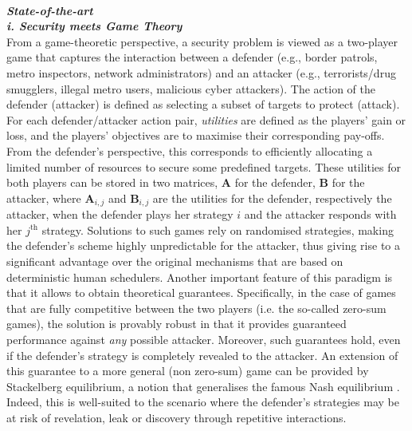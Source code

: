 \noindent \textbf{\textit{\\State-of-the-art}}
\noindent \textbf{\textit{\\i. Security meets Game Theory }}\\
From a game-theoretic perspective, a security problem is viewed as a two-player game that captures the interaction between a defender (e.g., border patrols, metro inspectors, network administrators) and an attacker (e.g., terrorists/drug smugglers, illegal metro users, malicious cyber attackers). The action of the defender (attacker) is defined as selecting a subset of targets to protect (attack). For each defender/attacker action pair, \textit{utilities} are defined as the players' gain or loss, and the players' objectives are to maximise their corresponding pay-offs. From the defender's perspective, this corresponds to efficiently allocating a limited number of resources to secure some predefined targets. These utilities for both players can be stored in two  matrices,  $\boldsymbol A$ for the defender,  $\boldsymbol B$ for the attacker, where $\boldsymbol A_{i,j}$ and  $\boldsymbol  B_{i,j}$  are the utilities for the defender, respectively the attacker, when the defender plays her strategy $i$ and the attacker responds with her $j^{\text{th}}$ strategy.
Solutions to such games rely on randomised strategies, making the defender's scheme highly unpredictable for the attacker, thus giving rise to a significant advantage over the original mechanisms that are based on deterministic human schedulers. 
Another important feature of this paradigm is that it allows to obtain theoretical guarantees. Specifically, in the case of games that are fully competitive between the two players  (i.e. the so-called zero-sum games), the solution is provably robust in that it provides guaranteed performance against {\em any} possible attacker. Moreover, such guarantees hold, even if the defender's strategy is completely revealed to the attacker.  
An extension of this guarantee to a more general (non zero-sum) game can be provided by Stackelberg equilibrium, a notion that generalises the famous Nash equilibrium \cite{korzhyk2011stackelberg}. Indeed, this is well-suited to the scenario where the defender's strategies may be at risk of revelation, leak or discovery through repetitive interactions. 

